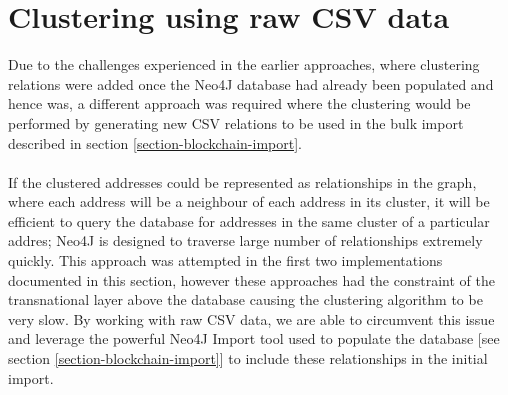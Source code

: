 \section{Clustering using raw CSV data}\label{clustering-raw-csv}
Due to the challenges experienced in the earlier approaches, where clustering relations were added once the Neo4J database had already been populated and hence was, a different approach was required where the clustering would be performed by generating new CSV relations to be used in the bulk import described in section \ref{section-blockchain-import}. 
\\\\
If the clustered addresses could be represented as relationships in the graph, where each address will be a neighbour of each address in its cluster, it will be efficient to query the database for addresses in the same cluster of a particular addres;  Neo4J is designed to traverse large number of relationships extremely quickly. This approach was attempted in the first two implementations documented in this section, however these approaches had the constraint of the transnational layer above the database causing the clustering algorithm to be very slow. By working with raw CSV data, we are able to circumvent this issue and leverage the powerful Neo4J Import tool used to populate the database [see section \ref{section-blockchain-import}] to include these relationships in the initial import. 

